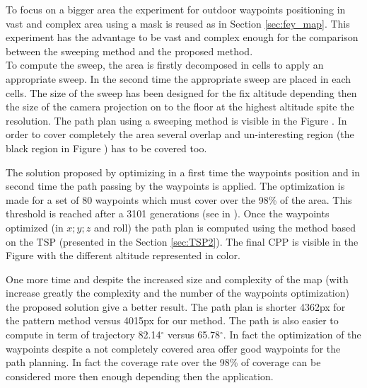 To focus on a bigger area the experiment for outdoor waypoints positioning in vast and complex area using  a mask  is reused as in Section \ref{sec:fey_map}. This experiment has the advantage to be vast and complex enough for the comparison between the sweeping method and the proposed method.\\
To compute the sweep, the area is firstly decomposed in cells to apply an appropriate sweep. In the second time the appropriate sweep are placed in each cells. The size of the sweep has been designed for the fix altitude depending then the size of the camera projection on to the floor at the highest altitude spite the resolution. 
The path plan using a sweeping method is visible in the Figure . In order to cover completely the area several overlap and un-interesting region (the black region in Figure ) has to be covered too. 

The solution proposed by optimizing in a first time the waypoints position and in second time the path passing by the waypoints is applied. The optimization is made for a set of 80 waypoints which must cover over the 98\% of the area. This threshold is reached after a 3101 generations (see in ). Once the waypoints optimized (in $x;y;z$ and roll) the path plan is computed using the method based on the TSP (presented in the Section \ref{sec:TSP2}). The final CPP is visible in the Figure  with the different altitude represented in color.

One more time and despite the increased size and complexity of the map (with increase greatly the complexity and the number of the waypoints optimization) the proposed solution give a better result. The path plan is shorter 4362px for the pattern method versus 4015px for our method. The path is also  easier to compute  in term of trajectory 82.14$^\circ$ versus 65.78$^\circ$.
In fact the optimization of the waypoints despite a not completely covered area offer good waypoints for the path planning. In fact the coverage rate over the 98\% of coverage can be considered more then enough depending then the application.
  
